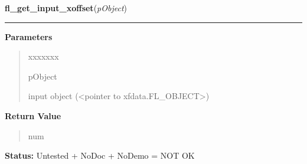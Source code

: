 \hspace{.8\funcindent}\begin{boxedminipage}{\funcwidth}

    \raggedright \textbf{fl\_get\_input\_xoffset}(\textit{pObject})

    \vspace{-1.5ex}

    \rule{\textwidth}{0.5\fboxrule}
\setlength{\parskip}{2ex}
\setlength{\parskip}{1ex}
      \textbf{Parameters}
      \vspace{-1ex}

      \begin{quote}
        \begin{Ventry}{xxxxxxx}

          \item[pObject]

          input object ({\textless}pointer to 
          xfdata.FL\_OBJECT{\textgreater})

        \end{Ventry}

      \end{quote}

      \textbf{Return Value}
    \vspace{-1ex}

      \begin{quote}
      num

      \end{quote}

\textbf{Status:} Untested + NoDoc + NoDemo = NOT OK



    \end{boxedminipage}

    \label{xformslib:library:fl_set_input_fieldchar}

    \vspace{0.5ex}

